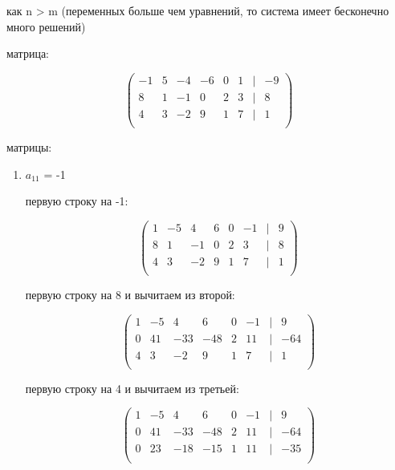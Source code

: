 \documentclass{report}
\begin{document}
\begin{itemize}

 как n > m (переменных больше чем уравнений, то система имеет бесконечно много решений)

 матрица:

\begin{center}
	{
		\[
		\begin{pmatrix}
			-1 & 5 & -4 & -6 & 0 & 1 & | & -9 \\
			8 & 1 & -1 & 0 & 2 & 3 & | & 8 \\
			4 & 3 & -2 & 9 & 1 & 7 & | & 1 \\
		\end{pmatrix}
		\]
	}
\end{center}

 матрицы:

\begin{enumerate}
	\item{$a_{11}$ = -1}
	
	\begin{itemize}
		 первую строку на -1:
		
		\begin{center}
			{
				\[
				\begin{pmatrix}
					1 & -5 & 4 & 6 & 0 & -1 & | & 9 \\
					8 & 1 & -1 & 0 & 2 & 3 & | & 8 \\
					4 & 3 & -2 & 9 & 1 & 7 & | & 1 \\
				\end{pmatrix}
				\]
			}
		\end{center}
		
		 первую строку на 8 и вычитаем из второй:
		
		\begin{center}
			{
				\[
				\begin{pmatrix}
					1 & -5 & 4 & 6 & 0 & -1 & | & 9 \\
					0 & 41 & -33 & -48 & 2 & 11 & | & -64 \\
					4 & 3 & -2 & 9 & 1 & 7 & | & 1 \\
				\end{pmatrix}
				\]
			}
		\end{center}
		
		 первую строку на 4 и вычитаем из третьей:
		
		\begin{center}
			{
				\[
				\begin{pmatrix}
					1 & -5 & 4 & 6 & 0 & -1 & | & 9 \\
					0 & 41 & -33 & -48 & 2 & 11 & | & -64 \\
					0 & 23 & -18 & -15 & 1 & 11 & | & -35 \\
				\end{pmatrix}
				\]
			}
		\end{center}
		

\end{itemize}
\end{enumerate}
\end{itemize}
\end{document}
